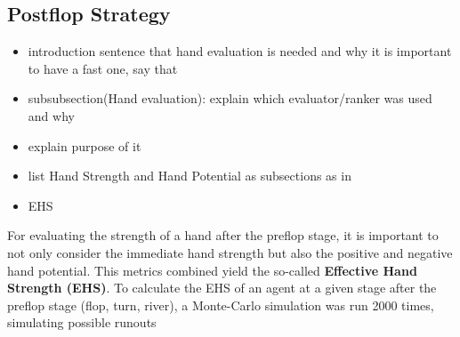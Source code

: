 \subsection{Postflop Strategy}
\begin{itemize}
\item introduction sentence that hand evaluation is needed and why it is important to have a fast one, say that 
\item subsubsection(Hand evaluation): explain which evaluator/ranker was used and why
\item explain purpose of it
\item list Hand Strength and Hand Potential as subsections as in \cite{opp_master}
\item EHS
\end{itemize}
For evaluating the strength of a hand after the preflop stage, it is important to not only consider the immediate hand strength but also the positive and negative hand potential. This metrics combined yield the so-called \textbf{Effective Hand Strength (EHS)}. To calculate the EHS of an agent at a given stage after the preflop stage (flop, turn, river), a Monte-Carlo simulation was run 2000 times, simulating possible runouts
